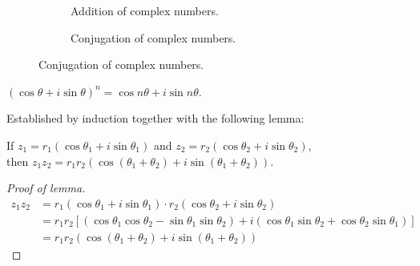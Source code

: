 \documentclass{../../template/note}
\begin{document}
    \begin{figure}[ht]
        \centering
        \hfill
        \begin{subfigure}[t]{0.4\textwidth}
            \caption{Addition of complex numbers.}
            \label{fig:argand-addition}
        \end{subfigure}
        \hfill
        \begin{subfigure}[t]{0.35\textwidth}
            \caption{Conjugation of complex numbers.}
            \label{fig:argand-conjugation}
        \end{subfigure}
        \hfill
    \end{figure}


    \begin{theorem}[de Moivre]
        \label{de-moivre-theorem}
        \((\cos \theta + i \sin \theta)^n = \cos n\theta + i \sin n\theta\).
    \end{theorem}

    \noindent Established by induction together with the following lemma:

    \begin{lemma}
        If \(z_1=r_1(\cos \theta_1 + i \sin \theta_1)\) and \(z_2=r_2(\cos \theta_2 + i \sin \theta_2)\), \\ then \(z_1z_2 = r_1r_2\left(\cos(\theta_1 + \theta_2) + i \sin(\theta_1+\theta_2)\right)\).
    \end{lemma}

    \begin{proof}[Proof of lemma]
        \begin{align*}
            z_1z_2 &= r_1(\cos \theta_1 + i \sin \theta_1) \cdot r_2(\cos \theta_2 + i \sin \theta_2) \\
            &= r_1r_2\left[(\cos \theta_1 \cos \theta_2 - \sin \theta_1 \sin \theta_2)+i(\cos \theta_1 \sin \theta_2 + \cos \theta_2 \sin \theta_1)\right] \\
            &= r_1r_2(\cos(\theta_1 + \theta_2) + i \sin(\theta_1 + \theta_2))
        \end{align*} 
    \end{proof}
\end{document}
